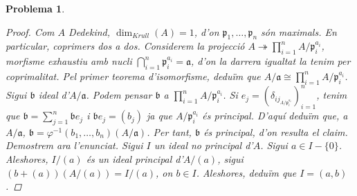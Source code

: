 \documentclass{article}
\newtheorem{problema}{Problema}
\begin{document}
\begin{problema}
\begin{enumerate}
\begin{proof}
            Com $A$ Dedekind, $\dim_{Krull}(A)=1$, d'on $\mathfrak{p}_{1},\ldots,\mathfrak{p}_{n}$ són maximals. En particular, coprimers dos a dos. Considerem la projecció $A\twoheadrightarrow\prod_{i=1}^{n}A/\mathfrak{p}_{i}^{a_{i}}$, morfisme exhaustiu amb nucli $\bigcap_{i=1}^{n}\mathfrak{p}_{i}^{a_{i}}=\mathfrak{a}$, d'on la darrera igualtat la tenim per coprimalitat. Pel primer teorema d'isomorfisme, deduïm que $A/\mathfrak{a}\cong\prod_{i=1}^{n}A/\mathfrak{p}_{i}^{a_{i}}$. Sigui $\mathfrak{b}$ ideal d'$A/\mathfrak{a}$. Podem pensar $\mathfrak{b}$ a $\prod_{i=1}^{n}A/\mathfrak{p}_{i}^{a_{i}}$. Si $e_{j}=(\delta_{ij_{A/\mathfrak{p}_{i}^{a_{i}}}})_{i=1}^{n}$, tenim que $\mathfrak{b}=\sum_{j=1}^{n}\mathfrak{b}e_{j}$ i $\mathfrak{b}e_{j}=(b_{j})$ ja que $A/\mathfrak{p}_{i}^{a_{i}}$ és principal. D'aquí deduïm que, a $A/\mathfrak{a}$, $\mathfrak{b}=\varphi^{-1}(b_{1},\ldots,b_{n})(A/\mathfrak{a})$. Per tant, $\mathfrak{b}$ és principal, d'on resulta el claim.\newline
            Demostrem ara l'enunciat. Sigui $I$ un ideal no principal d'$A$. Sigui $a\in I-\{0\}$. Aleshores, $I/(a)$ és un ideal principal d'$A/(a)$, sigui $(b+(a))(A/(a))=I/(a)$, on $b\in I$. Aleshores, deduïm que $I=(a,b)$.
        \end{proof}
    \end{enumerate}
\end{problema}
\end{document}
